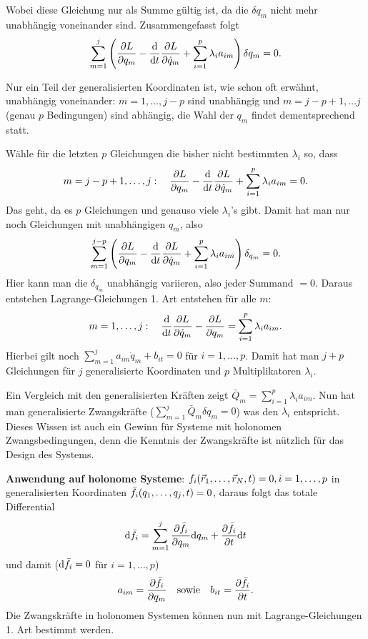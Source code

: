 Wobei diese Gleichung nur als Summe gültig ist, da die $\delta q_m$ nicht mehr unabhängig voneinander sind. Zusammengefasst folgt
\[
	\sum_{m=1}^j \left( \frac{\partial L}{\partial q_m} - \frac{\mathrm d}{\mathrm d t} \frac{\partial L}{\partial \dot{q}_m} + \sum_{i=1}^p \lambda_i a_{im} \right) \delta q_m = 0
	\text{.}
\]

Nur ein Teil der generalisierten Koordinaten ist, wie schon oft erwähnt, unabhängig voneinander: $m = 1, \dots, j - p$ sind unabhängig und $m = j - p + 1, \dots j$ (genau $p$ Bedingungen) sind abhängig, die Wahl der $q_m$ findet dementsprechend statt.

Wähle für die letzten $p$ Gleichungen die bisher nicht bestimmten $\lambda_i$ so, dass
\[
	m = j-p+1, \dots, j: 
	\quad 
	\frac{\partial L}{\partial q_m} - \frac{\mathrm d}{\mathrm d t} \frac{\partial L}{\partial \dot{q}_m} + \sum_{i=1}^p \lambda_i a_{im} = 0
	\text{.}
\]
Das geht, da es $p$ Gleichungen und genauso viele $\lambda_i$'s gibt. Damit hat man nur noch Gleichungen mit unabhängigen $q_m$, also
\[
	\sum^{j - p}_{m = 1} \left( \frac{\partial L}{\partial q_m} - \frac{\mathrm d}{\mathrm d t} \frac{\partial L}{\partial \dot{q}_m} + \sum^p_{i = 1} \lambda_i a_{im} \right) \delta_{q_m} = 0
	\text{.}
\]
Hier kann man die $\delta_{q_m}$ unabhängig variieren, also jeder Summand $=0$. Daraus entstehen Lagrange-Gleichungen 1. Art entstehen für alle $m$:
\[
	m = 1, \dots, j:
	\quad
	\frac{\mathrm d}{\mathrm d t} \frac{\partial L}{\partial \dot{q}_m} - \frac{\partial L}{\partial q_m} = \sum_{i=1}^p \lambda_i a_{im}
	\text{.}
\]
Hierbei gilt noch $\sum_{m=1}^j a_{im} \dot{q}_m + b_{it} = 0$ für $i = 1, \dots, p$. Damit hat man $j + p$ Gleichungen für $j$ generalisierte Koordinaten und $p$ Multiplikatoren $\lambda_i$.

Ein Vergleich mit den generalisierten Kräften zeigt $\bar{Q}_m = \sum_{i=1}^{p} \lambda_i a_{im}$.
Nun hat man generalisierte Zwangskräfte ($\sum_{m=1}^j \bar{Q}_m \delta q_m = 0$) was den $\lambda_i$ entspricht.
Dieses Wissen ist auch ein Gewinn für Systeme mit holonomen Zwangsbedingungen, denn die Kenntnis der Zwangskräfte ist nützlich für das Design des Systems.

\textbf{Anwendung auf holonome Systeme}: 
$f_i(\vec{r}_1, \dots, \vec{r}_N, t) = 0, i = 1, \dots, p$ in generalisierten Koordinaten $\bar{f}_i(q_1, \dots, q_j, t) = 0$, daraus folgt das totale Differential 
\[
	\mathrm d \bar{f}_i = \sum_{m=1}^j \frac{\partial \bar{f}_i}{\partial q_m} \mathrm d q_m + \frac{\partial \bar{f}_i}{\partial t} \mathrm d t
\]
und damit ($\mathrm d \bar{f}_i = 0$ für $i = 1, \dots, p$)
\[
	a_{im} = \frac{\partial \bar{f}_i}{\partial q_m}
	\quad \text{sowie} \quad
	b_{it} = \frac{\partial \bar{f}_i}{\partial t}
	\text{.}
\]
Die Zwangskräfte in holonomen Systemen können nun mit Lagrange-Gleichungen 1. Art bestimmt werden.

